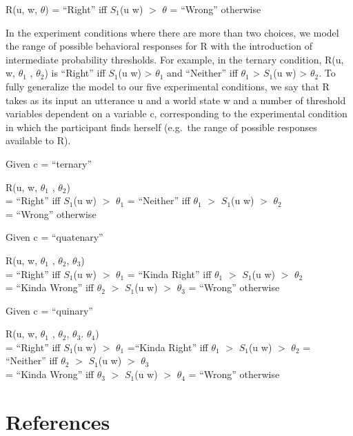 \documentclass[floatsintext,man]{apa6}
\theoremstyle{definition}
\theoremstyle{definition}
\theoremstyle{definition}
\theoremstyle{remark}
\begin{document}
R(u, w, \(\theta\)) = \enquote{Right} iff \(S_1\)(u \textbar{} w) \(>\)
\(\theta\) = \enquote{Wrong} otherwise

In the experiment conditions where there are more than two choices, we
model the range of possible behavioral responses for R with the
introduction of intermediate probability thresholds. For example, in the
ternary condition, R(u, w, \(\theta_1\) , \(\theta_2\)) is
\enquote{Right} iff \(S_1\)(u \textbar{} w) \textgreater{} \(\theta_1\)
and \enquote{Neither} iff \(\theta_1\) \textgreater{} \(S_1\)(u
\textbar{} w) \textgreater{} \(\theta_2\). To fully generalize the model
to our five experimental conditions, we say that R takes as its input an
utterance u and a world state w and a number of threshold variables
dependent on a variable c, corresponding to the experimental condition
in which the participant finds herself (e.g.~the range of possible
responses available to R).

Given c = \enquote{ternary}

R(u, w, \(\theta_1\) , \(\theta_2\))\\
= \enquote{Right} iff \(S_1\)(u \textbar{} w) \(>\) \(\theta_1\) =
\enquote{Neither} iff \(\theta_1\) \(>\) \(S_1\)(u \textbar{} w) \(>\)
\(\theta_2\)\\
= \enquote{Wrong} otherwise

Given c = \enquote{quatenary}

R(u, w, \(\theta_1\) , \(\theta_2\), \(\theta_3\))\\
= \enquote{Right} iff \(S_1\)(u \textbar{} w) \(>\) \(\theta_1\) =
\enquote{Kinda Right} iff \(\theta_1\) \(>\) \(S_1\)(u \textbar{} w)
\(>\) \(\theta_2\)\\
= \enquote{Kinda Wrong} iff \(\theta_2\) \(>\) \(S_1\)(u \textbar{} w)
\(>\) \(\theta_3\) = \enquote{Wrong} otherwise

Given c = \enquote{quinary}

R(u, w, \(\theta_1\) , \(\theta_2\), \(\theta_3\). \(\theta_4\))\\
= \enquote{Right} iff \(S_1\)(u \textbar{} w) \(>\) \(\theta_1\)
=\enquote{Kinda Right} iff \(\theta_1\) \(>\) \(S_1\)(u \textbar{} w)
\(>\) \(\theta_2\) = \enquote{Neither} iff \(\theta_2\) \(>\) \(S_1\)(u
\textbar{} w) \(>\) \(\theta_3\)\\
= \enquote{Kinda Wrong} iff \(\theta_3\) \(>\) \(S_1\)(u \textbar{} w)
\(>\) \(\theta_4\) = \enquote{Wrong} otherwise

\newpage

\section{References}\label{references}
\end{document}
